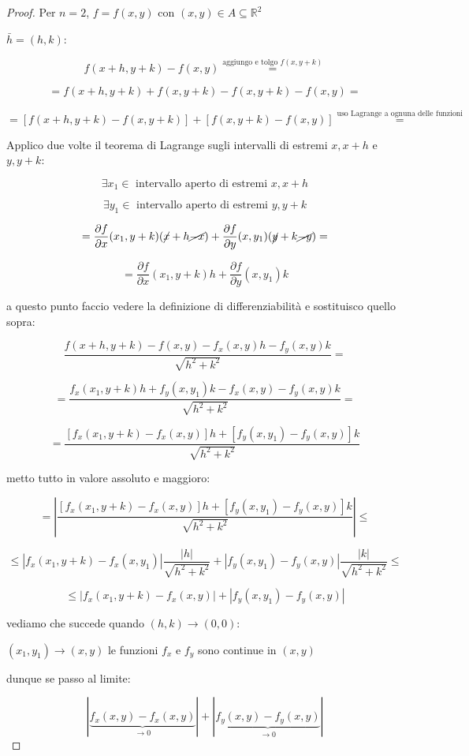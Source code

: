 \documentclass[../appunti-analisi.tex]{subfiles}
\begin{document}
\begin{proof}
       Per $n=2$, $f = f(x,y)$ con $(x,y) \in A \subseteq \mathbb{R}^{2}$ 

       $\bar{h} = (h,k)$:

       \[
           f(x+h,y+k) - f(x,y) \overset{\text{aggiungo e tolgo $f(x,y+k)$}}{=} 
       \]

       \[
           = f(x+h,y+k) + f(x,y+k) - f(x,y+k) - f(x,y) = 
       \]

       \[
           = [f(x+h,y+k) - f(x,y+k) ] + [f(x,y+k) - f(x,y)] \overset{\text{uso Lagrange a ognuna delle funzioni}}{=}
       \]

       Applico due volte il teorema di Lagrange sugli intervalli di estremi $x,x+h$ e $y,y+k$:

       \[
           \exists x_1 \in  \text{ intervallo aperto di estremi } x,x+h
       \]

       \[
           \exists y_1 \in  \text{ intervallo aperto di estremi } y,y+k
       \]

       \[
           = \frac{\partial f}{\partial x}(x_1,y+k) (\cancel{x} +h \cancel{-x}) + \frac{\partial f}{\partial y}(x,y_1) ( \cancel{y} + k \cancel{-y}) = 
       \]

       \[
           =\frac{\partial f}{\partial x}(x_1,y+k) h + \frac{\partial f}{\partial y}(x,y_1)k 
       \]

       a questo punto faccio vedere la definizione di differenziabilità e sostituisco quello sopra:

       \[
           \frac{f(x+h,y+k) - f(x,y) - f_x(x,y)h - f_y(x,y) k}{\sqrt{h^{2}+k^{2}}} = 
       \]

       \[
           = \frac{f_x(x_1,y+k) h + f_y(x,y_1) k -f_x(x,y) - f_y(x,y) k}{\sqrt{h^{2}+k^{2}}} = 
       \]

       \[
           = \frac{[f_x(x_1,y+k) - f_x(x,y)] h + [f_y(x,y_1) - f_y(x,y)] k}{\sqrt{h^{2}+k^{2}}}
       \]

       metto tutto in valore assoluto e maggioro:

       \[
           = |\frac{[f_x(x_1,y+k) - f_x(x,y)] h + [f_y(x,y_1) - f_y(x,y)] k}{\sqrt{h^{2}+k^{2}}}| \le 
       \]

       \[
       \le |f_x(x_1,y+k) - f_x(x,y_1)| \frac{|h|}{\sqrt{h^{2}+k^{2}}} + | f_y(x,y_1) - f_y(x,y)| \frac{|k|}{\sqrt{h^{2}+k^{2}}} \le 
       \]

       \[
            \le  |f_x(x_1,y+k) - f_x(x,y) | + |f_y(x,y_1) - f_y(x,y) |
       \]

       vediamo che succede quando $(h,k) \rightarrow (0,0)$:

        $(x_1,y_1) \rightarrow (x,y)$ le funzioni $f_x$ e $f_y$ sono continue in $(x,y)$

        dunque se passo al limite:

        \[
            |\underbrace{f_x(x,y) - f_x(x,y)}_\text{$\rightarrow 0$} | + |\underbrace{f_y(x,y) - f_y(x,y)}_\text{$\rightarrow 0$} |
        \]

\end{proof}
\end{document}
